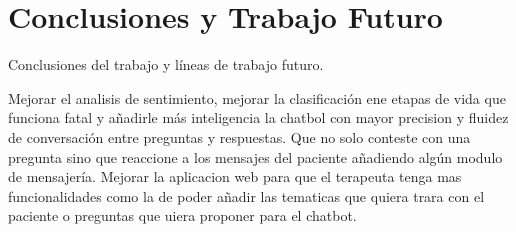 \chapter{Conclusiones y Trabajo Futuro}
\label{cap:conclusiones}

Conclusiones del trabajo y líneas de trabajo futuro.


Mejorar el analisis de sentimiento, mejorar la clasificación ene etapas de vida que funciona fatal y añadirle más inteligencia la chatbol con mayor precision y fluidez de conversación entre preguntas y respuestas. Que no solo conteste con una pregunta sino que reaccione a los mensajes del paciente añadiendo algún modulo de mensajería. Mejorar la aplicacion web para que el terapeuta tenga mas funcionalidades como la de poder añadir las tematicas que quiera trara con el paciente o preguntas que uiera proponer para el chatbot.